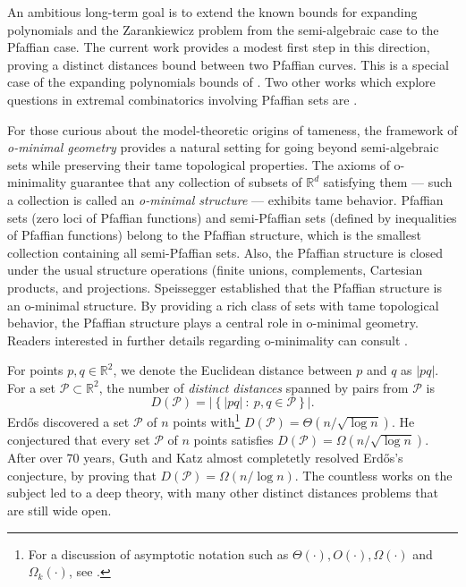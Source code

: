 \documentclass[11pt]{article}
\theoremstyle{definition}
\newcommand{\parag}[1]{\vspace{2mm}
\noindent{\bf #1} }
\newcommand{\RR}{\mathbb R}
\newcommand{\pts}{\mathcal{P}}
\begin{document}
An ambitious long-term goal is to extend the known bounds for expanding polynomials \cite{RSdZ16,RSS16} and the Zarankiewicz problem \cite{FPSSZ17,TidorYu24} from the semi-algebraic case to the Pfaffian case. 
The current work provides a modest first step in this direction, proving a distinct distances bound between two Pfaffian curves.
This is a special case of the expanding polynomials bounds of \cite{RSS16,SolyZahl24}.
Two other works which explore questions in extremal combinatorics involving Pfaffian sets are \cite{Balsera23,LNV24}.

For those curious about the model-theoretic origins of tameness, the framework of \emph{o-minimal geometry} provides a natural setting for going beyond semi-algebraic sets while preserving their tame topological properties. The axioms of o-minimality guarantee that any collection of subsets of $\RR^d$ satisfying them --- such a collection is called an \emph{o-minimal structure} --- exhibits tame behavior. Pfaffian sets (zero loci of Pfaffian functions) and semi-Pfaffian sets (defined by inequalities of Pfaffian functions) belong to the Pfaffian structure, which is the smallest collection containing all semi-Pfaffian sets. Also, the Pfaffian structure is closed under the usual structure operations (finite unions, complements, Cartesian products, and projections. Speissegger \cite{Sp99} established that the Pfaffian structure is an o-minimal structure. By providing a rich class of sets with tame topological behavior, the Pfaffian structure plays a central role in o-minimal geometry. Readers interested in further details regarding o-minimality can consult \cite{Dries98}.

\parag{Distinct distances between curves.}
For points $p,q\in\RR^2$, we denote the Euclidean distance between $p$ and $q$ as $|pq|$.
For a set $\pts\subset\RR^2$, the number of \emph{distinct distances} spanned by pairs from $\pts$ is
%
\[ D(\pts)= \left|\left\{|pq|\ :\ p,q\in \pts \right\}\right|. \] 
%
Erd\H os \cite{Erdos46} discovered a set $\pts$ of $n$ points with\footnote{For a discussion of asymptotic notation such as $\Theta(\cdot), O(\cdot), \Omega(\cdot)$ and $\Omega_k(\cdot)$, see \cite[Appendix A]{Sheffer22}.} $D(\pts)=\Theta(n/\sqrt{\log n})$. 
He conjectured that every set $\pts$ of $n$ points satisfies $D(\pts)=\Omega(n/\sqrt{\log n})$.
After over 70 years, Guth and Katz \cite{GK15} almost completetly resolved Erd\H os's conjecture, by proving that $D(\pts)=\Omega(n/\log n)$.
The countless works on the subject led to a deep theory, with many other distinct distances problems that are still wide open.
\end{document}
